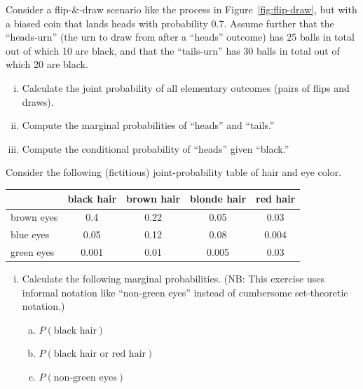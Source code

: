 \documentclass[nobib,nofonts]{tufte-handout}
\begin{document}
\bigskip
\noindent \colorbox{mygray}{\centering
  \begin{minipage}{1.0\textwidth}

    \begin{exercise}
      Consider a flip-\&-draw scenario like the process in Figure~\ref{fig:flip-draw}, but with a biased coin that lands heads with probability 0.7.
      Assume further that the ``heads-urn'' (the urn to draw from after a ``heads'' outcome) has 25 balls in total out of which 10 are black, and that the ``tails-urn'' has 30 balls in total out of which 20 are black.
      \begin{enumerate}[(i)]
        \item Calculate the joint probability of all elementary outcomes (pairs of flips and draws).
        \item Compute the marginal probabilities of ``heads'' and ``tails.''
        \item Compute the conditional probability of ``heads'' given ``black.''
      \end{enumerate}
    \end{exercise}

    \begin{exercise}
      Consider the following (fictitious) joint-probability table of hair and eye color.

      \begin{tabular}{lcccc}
                   & black hair & brown hair & blonde hair & red hair \\ \midrule
        brown eyes & 0.4        & 0.22       & 0.05        & 0.03 \\
        blue eyes  & 0.05       & 0.12       & 0.08        & 0.004 \\
        green eyes & 0.001      & 0.01       & 0.005       & 0.03
      \end{tabular}

    \begin{enumerate}[(i)]
      \item Calculate the following marginal probabilities. (NB: This exercise uses informal notation like ``non-green eyes'' instead of cumbersome set-theoretic notation.)

      \begin{enumerate}[a.]
        \item $P(\text{black hair})$
        \item $P(\text{black hair or red hair})$
        \item $P(\text{non-green eyes})$
      \end{enumerate}


\end{enumerate}
\end{exercise}
\end{minipage}}
\end{document}
